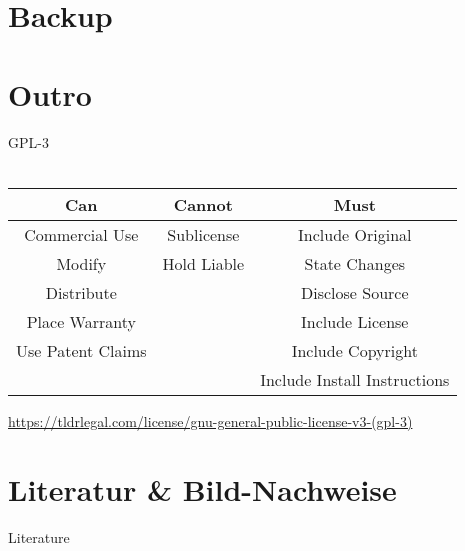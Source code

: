 {
\appendix

\section{Backup}


\section{Outro}


\begin{frame}{GPL-3}
  \\
  \\
  \begin{tabular}{|c|c|c|}
    \hline 
    Can & Cannot & Must \\ 
    \hline 
    Commercial Use & Sublicense & Include Original \\ 
    \hline 
    Modify & Hold Liable & State Changes \\ 
    \hline 
    Distribute &  & Disclose Source \\ 
    \hline 
    Place Warranty &  & Include License \\ 
    \hline 
    Use Patent Claims &  & Include Copyright \\ 
    \hline 
    &  & Include Install Instructions \\ 
    \hline 
  \end{tabular} 
\end{frame}
\note
{
  \url{https://tldrlegal.com/license/gnu-general-public-license-v3-(gpl-3)}
}


\section{Literatur \& Bild-Nachweise}
\begin{frame}[allowframebreaks]{Literature}
	\tiny{
		
	}
\end{frame}
}


